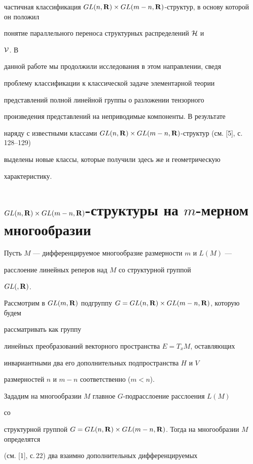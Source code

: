 частичная классификация $GL(n,\bold R)\times GL(m-n,\bold R)$-структур, в основу которой он положил 


понятие параллельного переноса структурных распределений $\cal H$ и 


$\cal V$. В 


данной работе мы продолжили исследования в этом направлении, сведя 


проблему классификации к классической задаче элементарной теории 


представлений полной линейной группы о разложении тензорного 


произведения представлений на неприводимые компоненты. В результате 


наряду с известными классами $GL(n,\bold R)\times GL(m-n,\bold R)$-структур (см. [5], с.\,128--129) 


выделены новые классы, которые получили здесь же и геометрическую 


характеристику. 


 


\section{$GL(n,\bold R)\times GL(m-n,\bold R)$-структуры на $m$-мерном многообразии} 


 


Пусть $M$ --- дифференцируемое многообразие размерности $m$ и $L(M)$ --- 


расслоение линейных реперов над $M$ со структурной группой 


$GL(,\bold R)$. 


Рассмотрим в $GL(m,\bold R)$ подгруппу $G=GL(n,\bold R)\times GL(m-n,\bold R)$, которую будем 


рассматривать как группу 


линейных преобразований векторного пространства $E=T_x M$, оставляющих 


инвариантными два его дополнительных подпространства $H$ и $V$ 


размерностей $n$ и $m-n$ соответственно ($m<n$). 


 


Зададим на многообразии $M$ главное $G$-подрасслоение расслоения $L(M)$ 


со 


структурной группой $G=GL(n,\bold R)\times GL(m-n,\bold R)$. Тогда на многообразии $M$ определятся 


(см. [1], с.\,22) два взаимно дополнительных дифференцируемых 


